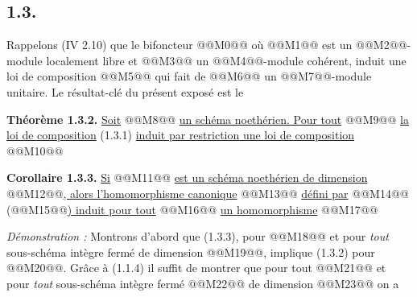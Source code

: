 
\subsection*{1.3.}
Rappelons (IV 2.10) que le bifoncteur
@@M0@@
où @@M1@@ est un @@M2@@-module localement libre et @@M3@@ un @@M4@@-module cohérent, induit une loi de composition
@@M5@@
qui fait de @@M6@@ un @@M7@@-module unitaire. Le résultat-clé du présent exposé est le

\textbf{Théorème 1.3.2.} \uline{Soit} @@M8@@ \uline{un schéma noethérien. Pour tout} @@M9@@ \uline{la loi de composition} (1.3.1) \uline{induit par restriction une loi de composition}
@@M10@@

\textbf{Corollaire 1.3.3.} \uline{Si} @@M11@@ \uline{est un schéma noethérien de dimension} @@M12@@\uline{, alors l'homomorphisme canonique}
@@M13@@
\uline{défini par} @@M14@@ (@@M15@@\uline{) induit pour tout} @@M16@@ \uline{un homomorphisme}
@@M17@@

\emph{Démonstration :} Montrons d'abord que (1.3.3), pour @@M18@@ et pour \emph{tout} sous-schéma intègre fermé de dimension @@M19@@, implique (1.3.2) pour @@M20@@. Grâce à (1.1.4) il suffit de montrer que pour tout @@M21@@ et pour \emph{tout} sous-schéma intègre fermé @@M22@@ de dimension @@M23@@ on a
